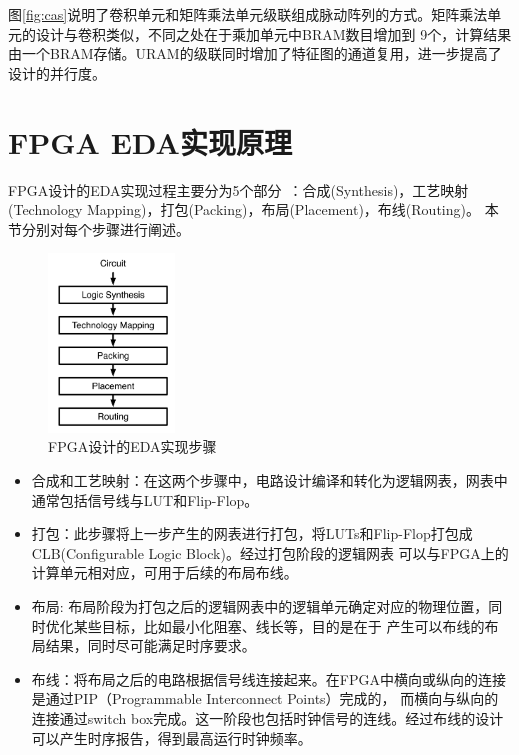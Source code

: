 图\ref{fig:cas}说明了卷积单元和矩阵乘法单元级联组成脉动阵列的方式。矩阵乘法单元的设计与卷积类似，不同之处在于乘加单元中BRAM数目增加到
9个，计算结果由一个BRAM存储。URAM的级联同时增加了特征图的通道复用，进一步提高了设计的并行度。

\section{FPGA EDA实现原理}

FPGA设计的EDA实现过程主要分为5个部分~\cite{li2017utplacef}：合成(Synthesis)，工艺映射(Technology Mapping)，打包(Packing)，布局(Placement)，布线(Routing)。
本节分别对每个步骤进行阐述。
\begin{figure}[h]
	\centering
	\includegraphics[width=0.3\textwidth]{figure/cad}
	\caption{FPGA设计的EDA实现步骤~\cite{li2017utplacef}} 
	\label{fig:eda}
\end{figure}
\begin{itemize}
    \item 合成和工艺映射：在这两个步骤中，电路设计编译和转化为逻辑网表，网表中通常包括信号线与LUT和Flip-Flop。
    \item 打包：此步骤将上一步产生的网表进行打包，将LUTs和Flip-Flop打包成CLB(Configurable Logic Block)。经过打包阶段的逻辑网表
    可以与FPGA上的计算单元相对应，可用于后续的布局布线。
    \item 布局: 布局阶段为打包之后的逻辑网表中的逻辑单元确定对应的物理位置，同时优化某些目标，比如最小化阻塞、线长等，目的是在于
    产生可以布线的布局结果，同时尽可能满足时序要求。
    \item 布线：将布局之后的电路根据信号线连接起来。在FPGA中横向或纵向的连接是通过PIP（Programmable Interconnect Points）完成的，
    而横向与纵向的连接通过switch box完成。这一阶段也包括时钟信号的连线。经过布线的设计可以产生时序报告，得到最高运行时钟频率。
\end{itemize}

